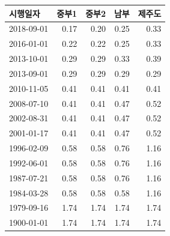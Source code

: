 \begin{defaulttable}
  \caption{\texttt{@vintage\_regulation} 최하층 바닥에 적용되는 열관류율
    $[\mathrm{W/(m^2K)}]$}
  \label{tbl:unknown-db-groundfloor}
  {\small
  \renewcommand{\arraystretch}{1.05}
  \begin{tabular}{lrrrr}
    \toprule
    시행일자 & 중부1 & 중부2 & 남부 & 제주도 \\ \midrule
    2018-09-01 & 0.17 & 0.20 & 0.25 & 0.33 \\
    2016-01-01 & 0.22 & 0.22 & 0.25 & 0.33 \\
    2013-10-01 & 0.29 & 0.29 & 0.33 & 0.39 \\
    2013-09-01 & 0.29 & 0.29 & 0.29 & 0.29 \\
    2010-11-05 & 0.41 & 0.41 & 0.41 & 0.41 \\
    2008-07-10 & 0.41 & 0.41 & 0.47 & 0.52 \\
    2002-08-31 & 0.41 & 0.41 & 0.47 & 0.52 \\
    2001-01-17 & 0.41 & 0.41 & 0.47 & 0.52 \\
    1996-02-09 & 0.58 & 0.58 & 0.76 & 1.16 \\
    1992-06-01 & 0.58 & 0.58 & 0.76 & 1.16 \\
    1987-07-21 & 0.58 & 0.58 & 0.76 & 1.16 \\
    1984-03-28 & 0.58 & 0.58 & 0.58 & 1.16 \\
    1979-09-16 & 1.74 & 1.74 & 1.74 & 1.74 \\
    1900-01-01 & 1.74 & 1.74 & 1.74 & 1.74 \\
    \bottomrule
  \end{tabular}
  }
\end{defaulttable}

